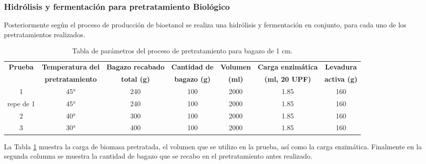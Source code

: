 \documentclass[12pt]{article}
\begin{document}
			
			
			
   	\subsubsection{ Hidrólisis y fermentación para pretratamiento Biológico}
   
   Posteriormente según el proceso de producción de bioetanol se realiza una hidrólisis y fermentación en conjunto, para cada uno de los pretratamientos realizados.
   
\begin{table}[H]
	\centering
	\caption{Tabla de parámetros del proceso de pretratamiento para bagazo de 1 cm.}
	\label{biolo parte 3}
	\resizebox{16cm}{!} {
	\begin{tabular}{|c|c|c|c|c|c|c|}
		\hline
	\textbf{Prueba}	& \textbf{Temperatura del} & \textbf{Bagazo recabado} & \textbf{Cantidad de} & \textbf{Volumen} & \textbf{Carga enzimática} & \textbf{Levadura} \\
	&	\textbf{pretratamiento} & \textbf{total (g)} & \textbf{bagazo (g)} & \textbf{(ml)} & \textbf{(ml, 20 UPF)} & \textbf{activa (g)} \\ \hline		
1	&	45° & 240 & 100 & 2000 & 1.85 & 160 \\ \hline
repe de 1&	45° & 240 & 100 & 2000 & 1.85 & 160 \\ \hline
2	&	40° & 300 & 100 & 2000 & 1.85 & 160 \\ \hline
3	&	30° & 400 & 100 & 2000 & 1.85 & 160 \\ \hline
	\end{tabular} }
	
\end{table}

  La Tabla \ref{biolo parte 3} muestra la carga de biomasa pretratada, el volumen que se utilizo en la prueba, así como la carga enzimática. Finalmente en la segunda columna se muestra la cantidad de bagazo que se recabo en el pretratamiento antes realizado. 
\end{document}
